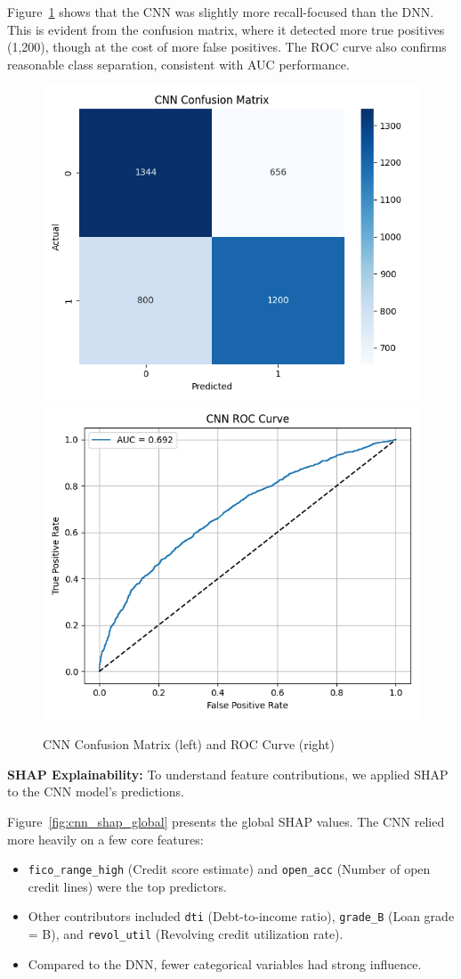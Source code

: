Figure~\ref{fig:cnn_conf_roc} shows that the CNN was slightly more recall-focused than the DNN. This is evident from the confusion matrix, where it detected more true positives (1,200), though at the cost of more false positives. The ROC curve also confirms reasonable class separation, consistent with AUC performance.

\begin{figure}[H]
    \centering
    \includegraphics[width=0.47\linewidth]{figures/cnn_confusion_matrix.png}
    \includegraphics[width=0.47\linewidth]{figures/cnn_roc_curve.png}
    \caption{CNN Confusion Matrix (left) and ROC Curve (right)}
    \label{fig:cnn_conf_roc}
\end{figure}

\textbf{SHAP Explainability:}  
To understand feature contributions, we applied SHAP to the CNN model’s predictions.

Figure~\ref{fig:cnn_shap_global} presents the global SHAP values. The CNN relied more heavily on a few core features:
\begin{itemize}
    \item \texttt{fico\_range\_high} (Credit score estimate) and \texttt{open\_acc} (Number of open credit lines) were the top predictors.
    \item Other contributors included \texttt{dti} (Debt-to-income ratio), \texttt{grade\_B} (Loan grade = B), and \texttt{revol\_util} (Revolving credit utilization rate).
    \item Compared to the DNN, fewer categorical variables had strong influence.
\end{itemize}

